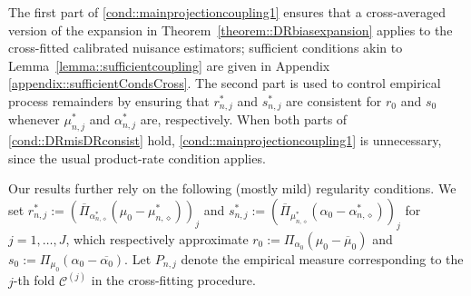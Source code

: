 \documentclass[11pt]{article}
\theoremstyle{plain}
\begin{document}
The first part of \ref{cond::mainprojectioncoupling1} ensures that a cross-averaged
version of the expansion in Theorem~\ref{theorem::DRbiasexpansion} applies to
the cross-fitted calibrated nuisance estimators; sufficient conditions akin to
Lemma~\ref{lemma::sufficientcoupling} are given in Appendix \ref{appendix::sufficientCondsCross}.
The second part is used to control empirical process
remainders by ensuring that $r_{n,j}^*$ and $s_{n,j}^*$ are consistent for $r_0$
and $s_0$ whenever $\mu_{n,j}^*$ and $\alpha_{n,j}^*$ are, respectively. When
both parts of \ref{cond::DRmisDRconsist} hold, \ref{cond::mainprojectioncoupling1}
is unnecessary, since the usual product-rate condition applies.




 
Our results further rely on the following (mostly mild) regularity conditions. 
We set
$r_{n,j}^* := (\overline{\Pi}_{\alpha_{n,\diamond}^*}(\mu_0 - \mu_{n,\diamond}^*))_j$
and
$s_{n,j}^* := (\overline{\Pi}_{\mu_{n,\diamond}^*}(\alpha_0 - \alpha_{n,\diamond}^*))_j$ for $j=1,\ldots,J$,
which respectively approximate $r_0 := \Pi_{\alpha_0} (\mu_0 - \overline{\mu}_0)$ and $s_0 := \Pi_{\mu_0} (\alpha_0 - \overline{\alpha_0})$. Let \( P_{n,j} \) denote the empirical measure corresponding to the \( j \)-th fold \( \mathcal{C}^{(j)} \) in the cross-fitting procedure. 

 
 
\end{document}

